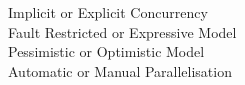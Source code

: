 \makeatletter {}\makeatother
{}
\label{chap:char}
Implicit or Explicit Concurrency\\
Fault Restricted or Expressive Model\\
Pessimistic or Optimistic Model\\
Automatic or Manual Parallelisation\\


\worksheetend

